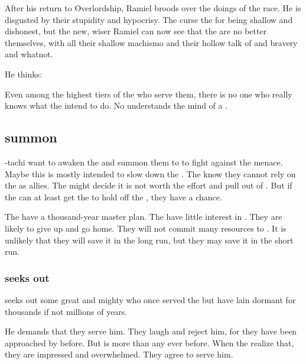 After his return to Overlordship, Ramiel broods over the doings of the \resphan race.
He is disgusted by their stupidity and hypocrisy. 
The \Mystraacht curse the \CiriathSepher for being shallow and dishonest, but the new, wiser Ramiel can now see that the \Mystraacht are no better themselves, with all their shallow machismo and their hollow talk of \honour and bravery and whatnot.

He thinks: 

Even among the highest tiers of the \resphain who serve them, there is no one who really knows what the \banelords intend to do.
No \resphan understands the mind of a \bane.









\subsection{\Dragons summon \xss}
\Secherdamon-tachi want to awaken the \xss and summon them to \Miith to fight against the \bane menace. 
Maybe this is mostly intended to slow down the \banes. 
The \dragons know they cannot rely on the \xss as allies.
The \xss might decide it is not worth the effort and pull out of \Miith.
But if the \dragons can at least get the \xss to hold off the \banes, they have a chance. 

The \banes have a thousand-year master plan.
The \xss have little interest in \Miith.
They are likely to give up and go home. 
They will not commit many resources to \Miith. 
It is unlikely that they will save it in the long run, but they may save it in the short run. 





\subsubsection{\Vizsherioch seeks out \daemons}
\Vizsherioch{} seeks out some great and mighty \daemons{} who once served the \xzaishanns{} but have lain dormant for thousands if not millions of years. 

He demands that they serve him. They laugh and reject him, for they have been approached by \dragons{} before. But \Vizsherioch{} is more \xzaishann{} than any \dragon{} ever before. When the \daemons{} realize that, they are impressed and overwhelmed. They agree to serve him. 

